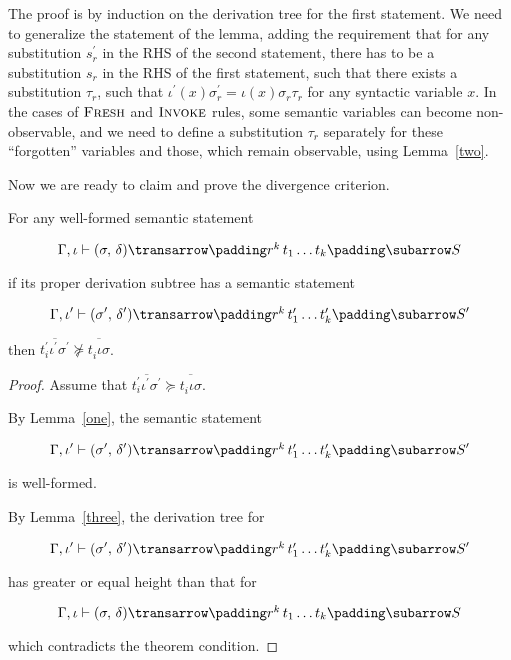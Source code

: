 The proof is by induction on the derivation tree for the first statement. We need to generalize the statement of the lemma, adding the requirement that 
for any substitution $s^\prime_r$ in the RHS of the second statement, there has to be a substitution $s_r$ in the RHS of the first statement,
such that there exists a substitution $\tau_r$, such that \mbox{$\iota^\prime(x) \sigma^\prime_r = \iota(x) \sigma_r \tau_r$} for any syntactic variable $x$. 
In the cases of $\textsc{Fresh}$ and $\textsc{Invoke}$ rules, some semantic variables can become non-observable, and we need to define a substitution $\tau_r$ 
separately for these ``forgotten'' variables and those, which remain observable, using Lemma~\ref{two}.

Now we are ready to claim and prove the divergence criterion.

\setcounter{theorem}{0}
\begin{theorem}
\label{criterion}
\normalfont
For any well-formed semantic statement 

$$
\otrans{\Gamma,\iota}{(\sigma,\,\delta)}{r^k\,t_1\dots t_k}{S}
$$ 

if its proper derivation subtree has a semantic statement 

$$
\otrans{\Gamma,\iota^\prime}{(\sigma^\prime,\,\delta^\prime)}{r^k\,t^\prime_1\dots t^\prime_k}{S^\prime}
$$

then \mbox{$\overline{t^\prime_i \iota^\prime \sigma^\prime} \not \succeq \overline{t^{\phantom{\prime}}_i \iota \sigma}$}. 
\end{theorem}
\begin{proof}
Assume that \mbox{$\overline{t^\prime_i \iota^\prime \sigma^\prime}\succeq \overline{t^{\phantom{\prime}}_i \iota \sigma}$}. 

By Lemma~\ref{one}, the semantic statement

$$
\otrans{\Gamma,\iota^\prime}{(\sigma^\prime,\,\delta^\prime)}{r^k\,t^\prime_1\dots t^\prime_k}{S^\prime}
$$

\noindent is well-formed.

By Lemma~\ref{three}, the derivation tree for

$$
\otrans{\Gamma,\iota^\prime}{(\sigma^\prime,\,\delta^\prime)}{r^k\,t^\prime_1\dots t^\prime_k}{S^\prime}
$$

\noindent has greater or equal height than that for

$$
\otrans{\Gamma,\iota}{(\sigma,\,\delta)}{r^k\,t_1\dots t_k}{S}
$$ 

\noindent which contradicts the theorem condition.

\end{proof}

